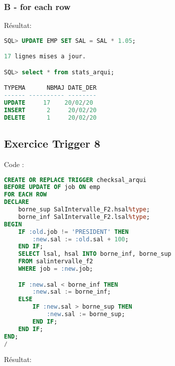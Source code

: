 \documentclass{article}
\begin{document}
\subsubsection{B - for each row}
Résultat:
\begin{lstlisting}[language=SQL,
    deletekeywords={char},
    morekeywords={DECLARE, LOOP, TYPE, FOR, IF, IS, OPEN, FETCH, DBMS_OUTPUT, PUT_LINE}]
SQL> UPDATE EMP SET SAL = SAL * 1.05;

17 lignes mises a jour.

SQL> select * from stats_arqui;

TYPEMA	    NBMAJ DATE_DER
------ ---------- --------
UPDATE     17    20/02/20
INSERT		2     20/02/20
DELETE		1     20/02/20
\end{lstlisting}


\subsection{Exercice Trigger 8}
Code :
\begin{lstlisting}[language=SQL,
    deletekeywords={char},
    morekeywords={DECLARE, LOOP, TYPE, FOR, IF, IS, OPEN, FETCH, DBMS_OUTPUT, PUT_LINE}]
CREATE OR REPLACE TRIGGER checksal_arqui
BEFORE UPDATE OF job ON emp
FOR EACH ROW
DECLARE
    borne_sup SalIntervalle_F2.hsal%type;
    borne_inf SalIntervalle_F2.lsal%type;
BEGIN
    IF :old.job != 'PRESIDENT' THEN
        :new.sal := :old.sal + 100;
    END IF;
    SELECT lsal, hsal INTO borne_inf, borne_sup
    FROM salintervalle_f2
    WHERE job = :new.job;

    IF :new.sal < borne_inf THEN
        :new.sal := borne_inf;
    ELSE
        IF :new.sal > borne_sup THEN
            :new.sal := borne_sup;
        END IF;
    END IF;
END;
/    
\end{lstlisting}
Résultat:
\end{document}
